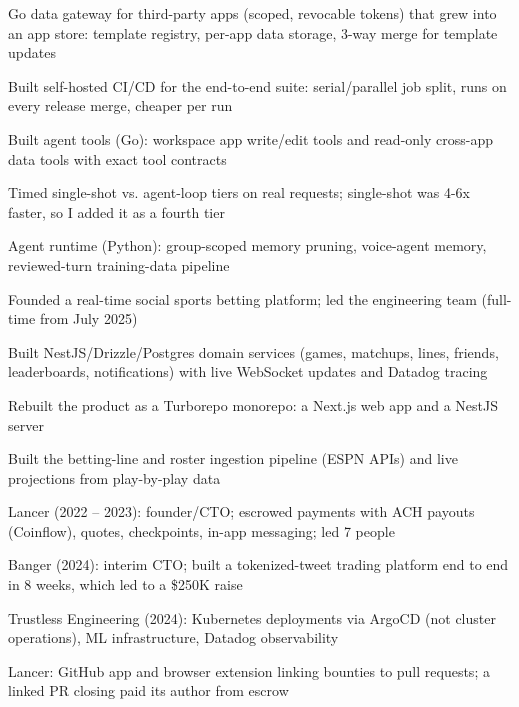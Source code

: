 \documentclass[print]{jack-resume}
\begin{document}
\begin{tightemize}
    \item Go data gateway for third-party apps (scoped, revocable tokens) that grew into an app store: template registry, per-app data storage, 3-way merge for template updates
    \item Built self-hosted CI/CD for the end-to-end suite: serial/parallel job split, runs on every release merge, cheaper per run
    \item Built agent tools (Go): workspace app write/edit tools and read-only cross-app data tools with exact tool contracts
    \item Timed single-shot vs. agent-loop tiers on real requests; single-shot was 4-6x faster, so I added it as a fourth tier
    \item Agent runtime (Python): group-scoped memory pruning, voice-agent memory, reviewed-turn training-data pipeline
\end{tightemize}
\sectionsep

\begin{tightemize}
    \item Founded a real-time social sports betting platform; led the engineering team (full-time from July 2025)
    \item Built NestJS/Drizzle/Postgres domain services (games, matchups, lines, friends, leaderboards, notifications) with live WebSocket updates and Datadog tracing
    \item Rebuilt the product as a Turborepo monorepo: a Next.js web app and a NestJS server
    \item Built the betting-line and roster ingestion pipeline (ESPN APIs) and live projections from play-by-play data
\end{tightemize}
\sectionsep

\begin{tightemize}
    \item Lancer (2022 -- 2023): founder/CTO; escrowed payments with ACH payouts (Coinflow), quotes, checkpoints, in-app messaging; led 7 people
    \item Banger (2024): interim CTO; built a tokenized-tweet trading platform end to end in 8 weeks, which led to a \$250K raise
    \item Trustless Engineering (2024): Kubernetes deployments via ArgoCD (not cluster operations), ML infrastructure, Datadog observability
    \item Lancer: GitHub app and browser extension linking bounties to pull requests; a linked PR closing paid its author from escrow
\end{tightemize}
\sectionsep
\end{document}
